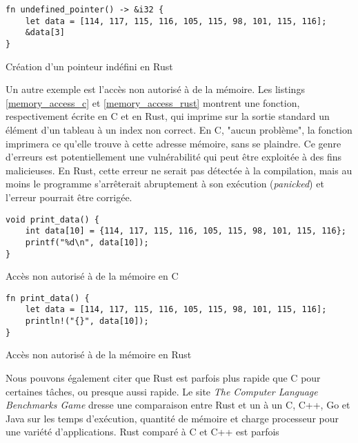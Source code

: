 \bigbreak
\begin{code}
    \begin{verbatim}
fn undefined_pointer() -> &i32 {
    let data = [114, 117, 115, 116, 105, 115, 98, 101, 115, 116];
    &data[3]
}
    \end{verbatim}
    \caption{Création d'un pointeur indéfini en Rust}
    \label{undefined_pointer_rust}
\end{code}
\bigbreak
Un autre exemple est l'accès non autorisé à de la mémoire. Les listings \ref{memory_access_c} 
et \ref{memory_access_rust} montrent une fonction, respectivement écrite en C et en Rust, qui 
imprime sur la sortie standard un élément d'un tableau à un index non correct. En C, "aucun problème", 
la fonction imprimera ce qu'elle trouve à cette adresse mémoire, sans se plaindre. Ce genre 
d'erreurs est potentiellement une vulnérabilité qui peut être exploitée à des fins malicieuses.
En Rust, cette erreur ne serait pas détectée à la compilation, mais au moins le programme 
s'arrêterait abruptement à son exécution (\textit{panicked}) et l'erreur pourrait être corrigée.
\bigbreak
\begin{code}
    \begin{verbatim}
void print_data() {
    int data[10] = {114, 117, 115, 116, 105, 115, 98, 101, 115, 116};
    printf("%d\n", data[10]);
}
    \end{verbatim}
    \caption{Accès non autorisé à de la mémoire en C}
    \label{memory_access_c}
\end{code}
\bigbreak
\bigbreak
\begin{code}
    \begin{verbatim}
fn print_data() {
    let data = [114, 117, 115, 116, 105, 115, 98, 101, 115, 116];
    println!("{}", data[10]);
}
    \end{verbatim}
    \caption{Accès non autorisé à de la mémoire en Rust}
    \label{memory_access_rust}
\end{code}
\bigbreak
Nous pouvons également citer que Rust est parfois plus rapide que C pour certaines tâches, ou 
presque aussi rapide. Le site \textit{The Computer Language Benchmarks Game} \cite{ref51} dresse 
une comparaison entre Rust et un à un C, C++, Go et Java sur les temps d'exécution, quantité de 
mémoire et charge processeur pour une variété d'applications. Rust comparé à C et C++ est parfois 
